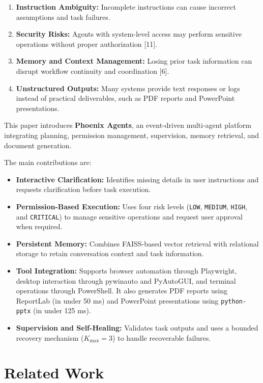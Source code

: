 \documentclass[conference]{IEEEtran}
\begin{document}
\begin{enumerate}
    \item \textbf{Instruction Ambiguity:} Incomplete instructions can cause incorrect assumptions and task failures.
    \item \textbf{Security Risks:} Agents with system-level access may perform sensitive operations without proper authorization [11].
    \item \textbf{Memory and Context Management:} Losing prior task information can disrupt workflow continuity and coordination [6].
    \item \textbf{Unstructured Outputs:} Many systems provide text responses or logs instead of practical deliverables, such as PDF reports and PowerPoint presentations.
\end{enumerate}

This paper introduces \textbf{Phoenix Agents}, an event-driven multi-agent platform integrating planning, permission management, supervision, memory retrieval, and document generation.

The main contributions are:

\begin{itemize}
    \item \textbf{Interactive Clarification:} Identifies missing details in user instructions and requests clarification before task execution.
    \item \textbf{Permission-Based Execution:} Uses four risk levels (\texttt{LOW}, \texttt{MEDIUM}, \texttt{HIGH}, and \texttt{CRITICAL}) to manage sensitive operations and request user approval when required.
    \item \textbf{Persistent Memory:} Combines FAISS-based vector retrieval with relational storage to retain conversation context and task information.
    \item \textbf{Tool Integration:} Supports browser automation through Playwright, desktop interaction through pywinauto and PyAutoGUI, and terminal operations through PowerShell. It also generates PDF reports using ReportLab (in under 50 ms) and PowerPoint presentations using \texttt{python-pptx} (in under 125 ms).
    \item \textbf{Supervision and Self-Healing:} Validates task outputs and uses a bounded recovery mechanism (\(K_{\text{max}}=3\)) to handle recoverable failures.
\end{itemize}

\section{Related Work}
\end{document}
